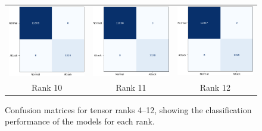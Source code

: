 \documentclass[preprint,12pt,authoryear]{elsarticle}
\begin{document}
\begin{figure}[H]
\begin{tabular}{ccc}
        \includegraphics[width=0.3\linewidth]{rank_10.png} &
        \includegraphics[width=0.3\linewidth]{rank_11.png} &
        \includegraphics[width=0.3\linewidth]{rank_12.png} \\
        \small Rank 10 & \small Rank 11 & \small Rank 12
    \end{tabular}
    \caption{Confusion matrices for tensor ranks 4–12, showing the classification performance of the models for each rank.}
    \label{fig:confusion_matrices_2}
\end{figure}
\end{document}

